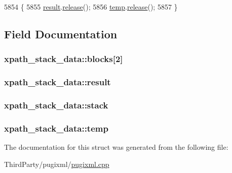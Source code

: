 \begin{DoxyCode}
5854         \{
5855             \hyperlink{structxpath__stack__data_ab073a685c66383ded44076993afe62d6}{result}.\hyperlink{classxpath__allocator_a9436b8bdef3e0e0ff0df28c2af6a430d}{release}();
5856             \hyperlink{structxpath__stack__data_a56e6bb486d52f4c5c2d02370e1b41058}{temp}.\hyperlink{classxpath__allocator_a9436b8bdef3e0e0ff0df28c2af6a430d}{release}();
5857         \}
\end{DoxyCode}


\subsection{Field Documentation}
\hypertarget{structxpath__stack__data_a6821cc444dd65d997467fd3f757f4aff}{
\subsubsection[{blocks}]{ xpath\-\_\-stack\-\_\-data\-::blocks\mbox{[}2\mbox{]}}}\label{structxpath__stack__data_a6821cc444dd65d997467fd3f757f4aff}
\hypertarget{structxpath__stack__data_ab073a685c66383ded44076993afe62d6}{
\subsubsection[{result}]{ xpath\-\_\-stack\-\_\-data\-::result}}\label{structxpath__stack__data_ab073a685c66383ded44076993afe62d6}
\hypertarget{structxpath__stack__data_ad26a92328f9aaf83fa62cb6695dbee90}{
\subsubsection[{stack}]{ xpath\-\_\-stack\-\_\-data\-::stack}}\label{structxpath__stack__data_ad26a92328f9aaf83fa62cb6695dbee90}
\hypertarget{structxpath__stack__data_a56e6bb486d52f4c5c2d02370e1b41058}{
\subsubsection[{temp}]{ xpath\-\_\-stack\-\_\-data\-::temp}}\label{structxpath__stack__data_a56e6bb486d52f4c5c2d02370e1b41058}


The documentation for this struct was generated from the following file\-:\begin{DoxyCompactItemize}
\item 
Third\-Party/pugixml/\hyperlink{pugixml_8cpp}{pugixml.\-cpp}\end{DoxyCompactItemize}
